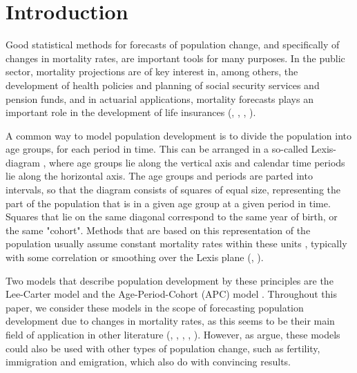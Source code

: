 \section{Introduction}

Good statistical methods for forecasts of population change, and specifically of changes in mortality rates, are important tools for many purposes. In the public sector, mortality projections are of key interest in, among others, the development of health policies and planning of social security services and pension funds, and in actuarial applications, mortality forecasts plays an important role in the development of life insurances (\textcite{BROUHNS2002373}, \textcite{RENSHAW2006556}, \textcite{CZADO2005260}, \textcite{LeeCarter1992}). 

\newpar A common way to model population development is to divide the population into age groups, for each period in time. This can be arranged in a so-called Lexis-diagram \parencite{CZADO2005260}, where age groups lie along the vertical axis and calendar time periods lie along the horizontal axis. The age groups and periods are parted into intervals, so that the diagram consists of squares of equal size, representing the part of the population that is in a given age group at a given period in time. Squares that lie on the same diagonal correspond to the same year of birth, or the same "cohort". Methods that are based on this representation of the population usually assume constant mortality rates within these units \parencite{CZADO2005260}, typically with some correlation or smoothing over the Lexis plane (\textcite{CZADO2005260}, \textcite{RieblerThesis2010}). 

\newpar Two models that describe population development by these principles are the Lee-Carter model \parencite{LeeCarter1992} and the Age-Period-Cohort (APC) model \parencite{Clayton1987}. Throughout this paper, we consider these models in the scope of forecasting population development due to changes in mortality rates, as this seems to be their main field of application in other literature (\textcite{LeeCarter1992}, \textcite{RieblerThesis2010}, \textcite{CZADO2005260}, \textcite{BROUHNS2002373}, \textcite{RENSHAW2006556}). However, as \textcite{Wisniowski2015} argue, these models could also be used with other types of population change, such as fertility, immigration and emigration, which \textcite{Wisniowski2015} also do with convincing results. 

